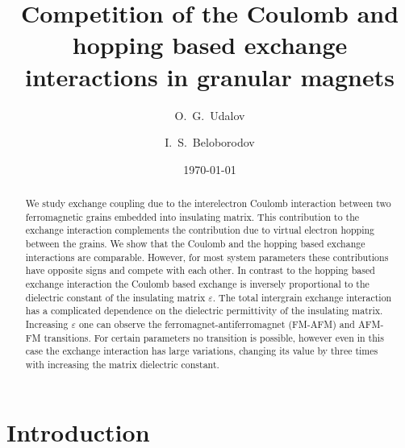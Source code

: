 \documentclass[aps,prb,amsmath,amssymb,twocolumn,superscriptaddress,showpacs,floatfix]{revtex4-1}
\begin{document}
\title{Competition of the Coulomb and hopping based exchange interactions in granular magnets}

\author{O.~G.~Udalov}
\author{I.~S.~Beloborodov}

\date{\today}


\begin{abstract}
We study exchange coupling due to the interelectron Coulomb interaction
between two ferromagnetic grains embedded into insulating matrix.
This contribution to the exchange interaction complements the contribution
due to virtual electron hopping between the grains. We show that the Coulomb and
the hopping based exchange interactions are comparable. However, for most system parameters
these contributions have opposite signs and compete with each other.
In contrast to the hopping based exchange interaction the Coulomb based exchange
is inversely proportional to the dielectric constant of the insulating matrix $\varepsilon$.
The total intergrain exchange interaction has a complicated dependence on the
dielectric permittivity of the insulating matrix. Increasing $\varepsilon$ one can observe
the ferromagnet-antiferromagnet (FM-AFM) and AFM-FM transitions.
For certain parameters no transition is possible, however even in this case the exchange interaction
has large variations, changing its value by three times with increasing the matrix dielectric constant.
\end{abstract}


\maketitle
\section{Introduction}
\end{document}
